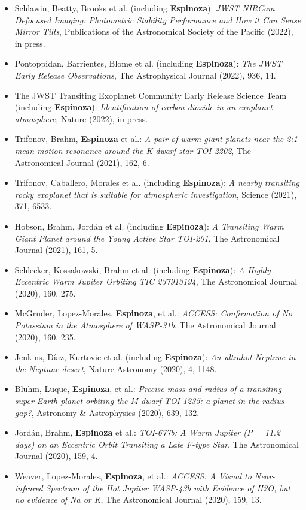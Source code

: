 \documentclass[12pt, a4paper]{article} %
\begin{document}
\begin{flushleft}
\begin{itemize}
\item Schlawin, Beatty, Brooks et al. (including \textbf{Espinoza}): \textit{JWST NIRCam Defocused Imaging: Photometric Stability Performance and How it Can Sense Mirror Tilts}, Publications of the Astronomical Society of the Pacific (2022), in press.
\item Pontoppidan, Barrientes, Blome et al. (including \textbf{Espinoza}): \textit{The JWST Early Release Observations}, The Astrophysical Journal (2022), 936, 14.
\item The JWST Transiting Exoplanet Community Early Release Science Team (including \textbf{Espinoza}): \textit{Identification of carbon dioxide in an exoplanet atmosphere}, Nature (2022), in press.
\item Trifonov, Brahm, \textbf{Espinoza} et al.: \textit{A pair of warm giant planets near the 2:1 mean motion resonance around the K-dwarf star TOI-2202}, The Astronomical Journal (2021), 162, 6.
\item Trifonov, Caballero, Morales et al. (including \textbf{Espinoza}): \textit{A nearby transiting rocky exoplanet that is suitable for atmospheric investigation}, Science (2021), 371, 6533.
\item Hobson, Brahm, Jord\'an et al. (including \textbf{Espinoza}): \textit{A Transiting Warm Giant Planet around the Young Active Star TOI-201}, The Astronomical Journal (2021), 161, 5.
\item Schlecker, Kossakowski, Brahm et al. (including \textbf{Espinoza}): \textit{A Highly Eccentric Warm Jupiter Orbiting TIC 237913194}, The Astronomical Journal (2020), 160, 275.
\item McGruder, Lopez-Morales, \textbf{Espinoza}, et al.: \textit{ACCESS: Confirmation of No Potassium in the Atmosphere of WASP-31b}, The Astronomical Journal (2020), 160, 235. 
\item Jenkins, D\'iaz, Kurtovic et al. (including \textbf{Espinoza}): \textit{An ultrahot Neptune in the Neptune desert}, Nature Astronomy (2020), 4, 1148.
\item Bluhm, Luque, \textbf{Espinoza}, et al.: \textit{Precise mass and radius of a transiting super-Earth planet orbiting the M dwarf TOI-1235: a planet in the radius gap?}, Astronomy \& Astrophysics (2020), 639, 132. 
\item Jord\'an, Brahm, \textbf{Espinoza} et al.: \textit{TOI-677b: A Warm Jupiter (P = 11.2 days) on an Eccentric Orbit Transiting a Late F-type Star}, The Astronomical Journal (2020), 159, 4. 
\item Weaver, Lopez-Morales, \textbf{Espinoza}, et al.: \textit{ACCESS: A Visual to Near-infrared Spectrum of the Hot Jupiter WASP-43b with Evidence of H2O, but no evidence of Na or K}, The Astronomical Journal (2020), 159, 13. 

\end{itemize}
\end{flushleft}
\end{document}
